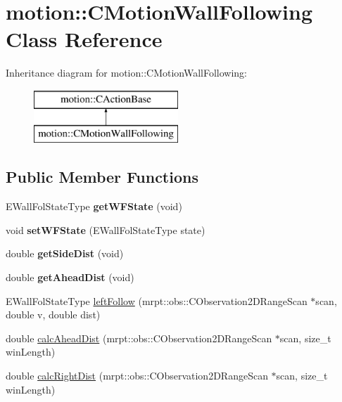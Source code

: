 \hypertarget{classmotion_1_1CMotionWallFollowing}{}\section{motion\+:\+:C\+Motion\+Wall\+Following Class Reference}
\label{classmotion_1_1CMotionWallFollowing}
Inheritance diagram for motion\+:\+:C\+Motion\+Wall\+Following\+:\begin{figure}[H]
\begin{center}
\leavevmode
\includegraphics[height=2.000000cm]{classmotion_1_1CMotionWallFollowing}
\end{center}
\end{figure}
\subsection*{Public Member Functions}
\begin{DoxyCompactItemize}
\item 
\mbox{\label{classmotion_1_1CMotionWallFollowing_a13696ff11374c7564808cc17ddafa941}} 
E\+Wall\+Fol\+State\+Type {\bfseries get\+W\+F\+State} (void)
\item 
\mbox{\label{classmotion_1_1CMotionWallFollowing_abfeb34abd4d51b73ae78c06b848291df}} 
void {\bfseries set\+W\+F\+State} (E\+Wall\+Fol\+State\+Type state)
\item 
\mbox{\label{classmotion_1_1CMotionWallFollowing_ab7795a6549c0573f4aedfdec0c5a3cb3}} 
double {\bfseries get\+Side\+Dist} (void)
\item 
\mbox{\label{classmotion_1_1CMotionWallFollowing_af40335dae19ff508b90067259cecdf2c}} 
double {\bfseries get\+Ahead\+Dist} (void)
\item 
E\+Wall\+Fol\+State\+Type \mbox{\hyperlink{classmotion_1_1CMotionWallFollowing_aba9a2fc075a0241af6ed9caf7bbbdb1d}{left\+Follow}} (mrpt\+::obs\+::\+C\+Observation2\+D\+Range\+Scan $\ast$scan, double v, double dist)
\item 
double \mbox{\hyperlink{classmotion_1_1CMotionWallFollowing_a5aa008f88629f10b7d44e528476ba03d}{calc\+Ahead\+Dist}} (mrpt\+::obs\+::\+C\+Observation2\+D\+Range\+Scan $\ast$scan, size\+\_\+t win\+Length)
\item 
double \mbox{\hyperlink{classmotion_1_1CMotionWallFollowing_afac9dc0c411ecc1effcea072964512e6}{calc\+Right\+Dist}} (mrpt\+::obs\+::\+C\+Observation2\+D\+Range\+Scan $\ast$scan, size\+\_\+t win\+Length)
\end{DoxyCompactItemize}
